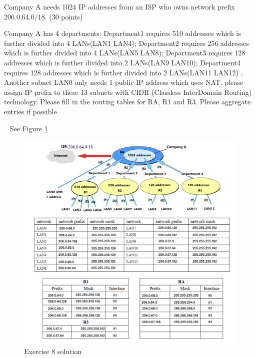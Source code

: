 \begin{exercise}[]{Company A needs 1024 IP addresses from an ISP who owns network prefix
  206.0.64.0/18. (30 points)

  Company A has 4 departments: Department1 requires 510 addresses which is further
  divided into 4 LANs(LAN1 LAN4); Department2 requires 256 addresses which is further
  divided into 4 LANs(LAN5 LAN8); Department3 requires 128 addresses which is further
  divided into 2 LANs(LAN9 LAN10); Department4 requires 128 addresses which is further
  divided into 2 LANs(LAN11 LAN12) . Another subnet LAN0 only needs 1 public IP address
  which uses NAT. please assign IP prefix to these 13 subnets with CIDR (Classless InterDomain Routing) technology. Please fill in the routing tables for RA, R1 and R3. Please
  aggregate entries if possible}
  \begin{solution}
  \par{~} See Figure \ref{fig:ex8}

  \begin{figure}[hb]
    \begin{center}
    \includegraphics[width=12cm]{img/ass4/ex8}
    \caption{Exercise 8 solution}
    \label{fig:ex8}
    \end{center}
  \end{figure}
  \end{solution}
  \label{ex8}
\end{exercise}